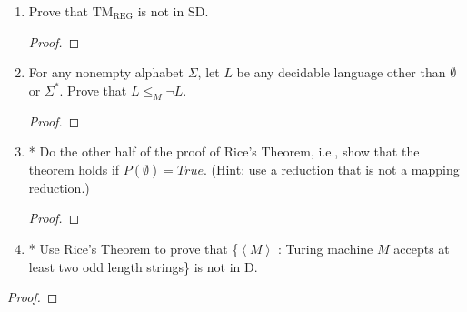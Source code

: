 \documentclass[10pt]{article}
\newcommand{\brackets}[1]{\left< #1 \right>}
\begin{document}
\begin{enumerate}[1)]
\begin{enumerate}[a)]
\item
$\{\brackets{M_a, M_b}$ : $L(M_a) - L(M_b) = \emptyset$\}.
\begin{proof}[Answer]
\end{proof}
\begin{proof}[Proof]
\end{proof}
\end{enumerate}



\item
Prove that $\mathrm{TM_{REG}}$ is not in SD.
\begin{proof}[Proof]
\end{proof}


\item
For any nonempty alphabet $\Sigma$, let $L$ be any decidable language other than $\emptyset$ or $\Sigma ^*$. Prove that $L \leq _M \lnot L$.
\begin{proof}[Proof]
\end{proof}



\item
* Do the other half of the proof of Rice's Theorem, i.e., show that the theorem holds if $P(\emptyset) = True$. (Hint: use a reduction that is not a mapping reduction.)
\begin{proof}[Proof]
\end{proof}


\item
* Use Rice's Theorem to prove that \{$\brackets{M}$ : Turing machine $M$ accepts at least two odd length strings\} is not in D.
\end{enumerate}
\begin{proof}[Proof]
\end{proof}
\end{document}
